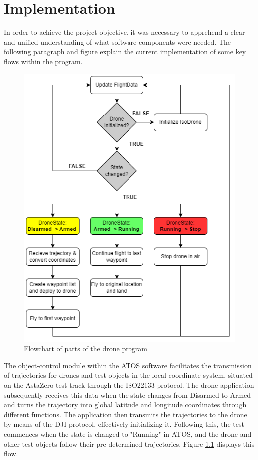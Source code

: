 \chapter{Implementation}
In order to achieve the project objective, it was necessary to apprehend a clear and unified understanding of what software components were needed. The following paragraph and figure explain the current implementation of some key flows within the program.
\begin{figure}[H]
    \centering
    \includegraphics[scale=0.5]{figure/Flowchart-drone.png}
    \caption{Flowchart of parts of the drone program}
    \label{fig:drone-flow}
\end{figure}
The object-control module within the ATOS software facilitates the transmission of trajectories for drones and test objects in the local coordinate system, situated on the AstaZero test track through the ISO22133 protocol. The drone application subsequently receives this data when the state changes from Disarmed to Armed and turns the trajectory into global latitude and longitude coordinates through different functions. The application then transmits the trajectories to the drone by means of the DJI protocol, effectively initializing it. Following this, the test commences when the state is changed to "Running" in ATOS, and the drone and other test objects follow their pre-determined trajectories. Figure \ref{fig:drone-flow} displays this flow.


